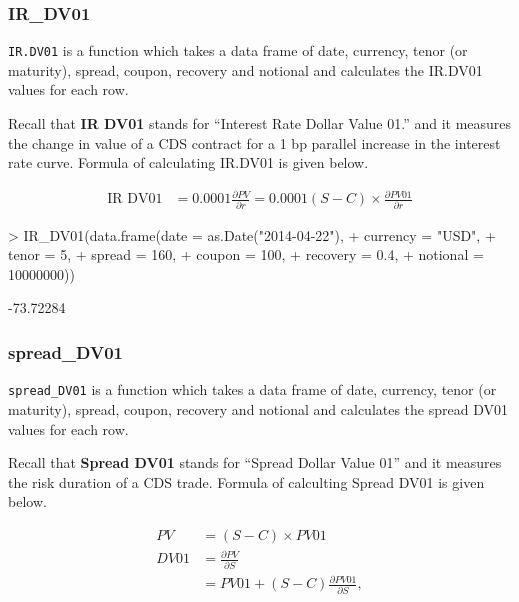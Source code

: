 \documentclass{jss}
\renewenvironment{Schunk}{\vspace{\topsep}}{\vspace{\topsep}}
\begin{document}
\subsubsection{IR\_DV01}

\texttt{IR.DV01} is a function which takes a data frame of date, currency, tenor (or maturity), spread, coupon, recovery and notional and calculates the IR.DV01 values for each row.

Recall that \textbf{IR DV01} stands for ``Interest Rate Dollar Value 01.'' and it measures the change in value of a CDS contract for a 1 bp parallel increase in the interest rate curve. Formula of calculating IR.DV01 is given below.

\begin{align*}
  \text{IR DV01} &= 0.0001 \frac{\partial PV}{\partial r} = 0.0001 (S - C) \times \frac{\partial PV01}{\partial r}
\end{align*}


\begin{Schunk}
\begin{Sinput}
> IR_DV01(data.frame(date     = as.Date("2014-04-22"),
+                    currency = "USD",
+                    tenor    = 5,
+                    spread   = 160,
+                    coupon   = 100,
+                    recovery = 0.4,
+                    notional = 10000000))
\end{Sinput}
\begin{Soutput}
[1] -73.72284
\end{Soutput}
\end{Schunk}


\subsubsection{spread\_DV01}

\texttt{spread\_DV01} is a function which takes a data frame of date, currency, tenor (or maturity), spread, coupon, recovery and notional and calculates the spread DV01 values for each row.

Recall that \textbf{Spread DV01} stands for ``Spread Dollar Value 01'' and it measures the risk duration of a CDS trade. Formula of calculting Spread DV01 is given below.

\begin{align*}
  PV &= (S - C) \times PV01 \\
  DV01 &= \frac{\partial PV}{\partial S} \\
  &= PV01 + (S - C) \frac{\partial PV01}{\partial S},
\end{align*}
\end{document}
